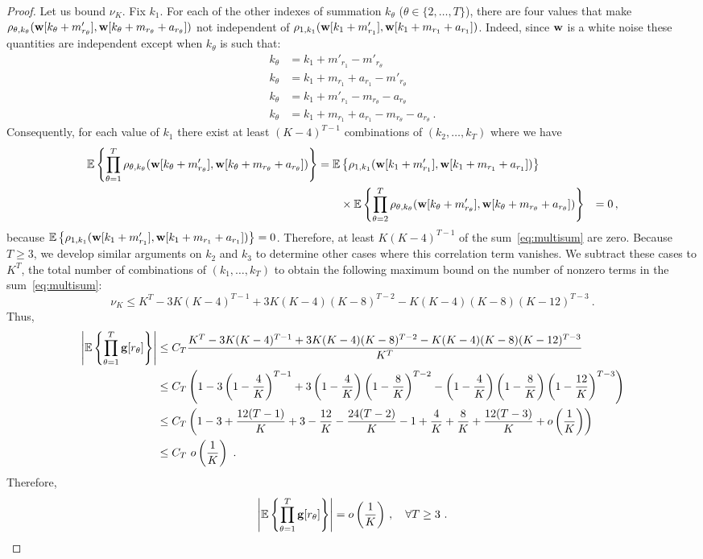 \documentclass[journal,onecolumn]{IEEEtran}
\begin{document}
\begin{proof}
Let us bound $\nu_K$. Fix $k_1$. For each of the other indexes of summation $k_\theta$ ($\theta\in\{2,\ldots,T\}$), there are four values that make $\rho_{\theta,k_\theta}({\mathbf w}[k_\theta+m'_{r_\theta}],{\mathbf w}[k_\theta+m_{r_\theta}+a_{r_\theta}])$ not independent of $\rho_{1,k_1}({\mathbf w}[k_1+m'_{r_1}],{\mathbf w}[k_1+m_{r_1}+a_{r_1}])$. Indeed, since ${\mathbf w}$ is a white noise these quantities are independent except when $k_\theta$ is such that:
\begin{align*}
k_\theta &= k_1+m'_{r_1}-m'_{r_\theta} \\
k_\theta &= k_1+m_{r_1}+a_{r_1} - m'_{r_\theta}\\
k_\theta &= k_1+m'_{r_1} - m_{r_\theta}- a_{r_\theta} \\
k_\theta &= k_1+m_{r_1}+a_{r_1} - m_{r_\theta}- a_{r_\theta}\ .
\end{align*}
Consequently, for each value of $k_1$ there exist at least $(K-4)^{T-1}$ combinations of $(k_2,\ldots,k_T)$ where we have
\begin{align*}
{\mathbb E}\left\{\prod_{\theta=1}^T \rho_{\theta,k_\theta}({\mathbf w}[k_\theta+m'_{r_\theta}],{\mathbf w}[k_\theta+m_{r_\theta}+a_{r_\theta}]) \right\} &= {\mathbb E}\left\{ \rho_{1,k_1}({\mathbf w}[k_1+m'_{r_1}],{\mathbf w}[k_1+m_{r_1}+a_{r_1}]) \right\} \\
&\hspace{20pt}\times{\mathbb E}\left\{\prod_{\theta=2}^T \rho_{\theta,k_\theta}({\mathbf w}[k_\theta+m'_{r_\theta}],{\mathbf w}[k_\theta+m_{r_\theta}+a_{r_\theta}]) \right\}
& = 0\,,
\end{align*}
because ${\mathbb E}\left\{ \rho_{1,k_1}({\mathbf w}[k_1+m'_{r_1}],{\mathbf w}[k_1+m_{r_1}+a_{r_1}]) \right\}=0$. Therefore, at least $K(K-4)^{T-1}$ of the sum~\eqref{eq:multisum} are zero. Because $T\geq 3$, we develop similar arguments on $k_2$ and $k_3$ to determine other cases where this correlation term vanishes. We subtract these cases to $K^T$, the total number of combinations of $(k_1,\ldots,k_T)$ to obtain the following maximum bound on the number of nonzero terms in the sum~\eqref{eq:multisum}:
\[
\nu_K\leq K^T - 3K(K-4)^{T-1} + 3K(K-4)(K-8)^{T-2}- K(K-4)(K-8)(K-12)^{T-3}\ .
\]
Thus,
\begin{align*}
\left|{\mathbb E}\left\{\prod_{\theta=1}^T{\mathbf g}[r_\theta]\right\}\right| &\leq C_T \dfrac{K^T - 3K(K-4)^{T-1} + 3K(K-4)(K-8)^{T-2}- K(K-4)(K-8)(K-12)^{T-3}}{K^T} \\
&\leq C_T \left( 1 - 3\left(1-\frac4K\right)^{T-1} + 3\left(1-\frac4K\right)\left(1-\frac8K\right)^{T-2}- \left(1-\frac4K\right)\left(1-\frac8K\right)\left(1-\frac{12}{K}\right)^{T-3} \right) \\
&\leq C_T \left( 1 - 3 +\frac{12(T-1)}{K} + 3-\frac{12}K-\frac{24(T-2)}{K} -1 + \frac{4}K + \frac{8}K +\frac{12(T-3)}{K} + o\left(\dfrac1K\right)\right) \\
&\leq C_T\ o\left(\dfrac1K\right)\ . \\
\end{align*}
Therefore,
\begin{equation*}
\left|\EE\left\{\prod_{\theta=1}^T\bg[r_\theta]\right\}\right| = o\left(\dfrac1K\right)\,,\quad\forall T\geq 3\ .\qedhere
\end{equation*}
\end{proof}
\end{document}
